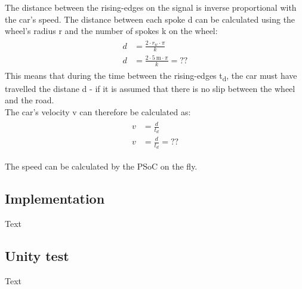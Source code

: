 The distance between the rising-edges on the signal is inverse proportional with the car's speed. The distance between each spoke d can be calculated using the wheel's radius r and the number of spokes k on the wheel:
\begin{align}
	\begin{split}
		d &= \frac{2 \cdot r_w \cdot \pi}{k}\\
		d &= \frac{2 \cdot \SI{5}{\meter} \cdot \pi}{k} = ??
	\end{split}
\end{align}
This means that during the time between the rising-edges t\textsubscript{d}, the car must have travelled the distane d - if it is assumed that there is no slip between the wheel and the road.\\
The car's velocity v can therefore be calculated as:
\begin{align}
	\begin{split}
		v &= \frac{d}{t_d}\\
		v &= \frac{d}{t_d} = ??
	\end{split}
\end{align}

The speed can be calculated by the PSoC on the fly.

\subsection{Implementation}
Text

\subsection{Unity test}
Text